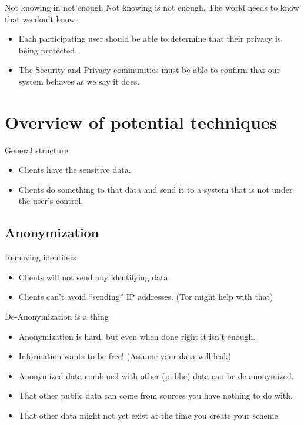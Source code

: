 \documentclass[xcolor={dvipsnames,table,hyperref}]{beamer}
\begin{document}
\begin{frame}{Not knowing in not enough}
  Not knowing is not enough. The world needs to know that we don't know.
  \begin{itemize}
    \item Each participating user should be able to determine that their privacy is being protected.
    \item The Security and Privacy communities must be able to confirm that our system behaves as we say it does.
  \end{itemize}

\end{frame}

\section{Overview of potential techniques}

\begin{frame}{General structure}
  \begin{itemize}
    \item Clients have the sensitive data.
    \item Clients do something to that data and send it to a system that is not under the user's control.
  \end{itemize}
\end{frame}

\subsection{Anonymization}

\begin{frame}{Removing identifers}
  \begin{itemize}
    \item Clients will not send any identifying data.
    \item Clients can't avoid “sending” IP addresses. (Tor might help with that)
  \end{itemize}
\end{frame}

\begin{frame}{De-Anonymization is a thing}
  \begin{itemize}
    \item Anonymization is hard, but even when done right it isn't enough.
    \item Information wants to be free! (Assume your data will leak)
    \item Anonymized data combined with other (public) data can be de-anonymized.
    \item That other public data can come from sources you have nothing to do with.
    \item That other data might not yet exist at the time you create your scheme.
  \end{itemize}
\end{frame}
\end{document}

